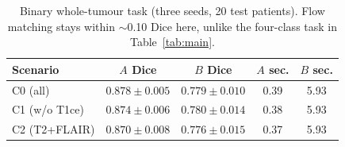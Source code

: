 \begin{table}[t]
\centering
\caption{Binary whole-tumour task (three seeds, 20 test patients). Flow matching stays within $\sim$0.10 Dice here, unlike the four-class task in Table~\ref{tab:main}.}
\label{tab:binary}
\small
\setlength{\tabcolsep}{3pt}
\begin{tabular}{lcccc}
\toprule
Scenario & $A$ Dice & $B$ Dice & $A$ sec. & $B$ sec. \\
\midrule
C0 (all) & $0.878\pm0.005$ & $0.779\pm0.010$ & 0.39 & 5.93 \\
C1 (w/o T1ce) & $0.874\pm0.006$ & $0.780\pm0.014$ & 0.38 & 5.93 \\
C2 (T2+FLAIR) & $0.870\pm0.008$ & $0.776\pm0.015$ & 0.37 & 5.93 \\
\bottomrule
\end{tabular}
\end{table}

